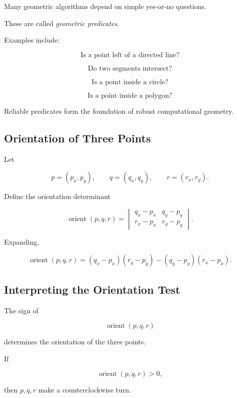 Many geometric algorithms depend on simple yes-or-no questions.

These are called \emph{geometric predicates}.

Examples include:

\[
\boxed{
\text{Is a point left of a directed line?}
}
\]

\[
\boxed{
\text{Do two segments intersect?}
}
\]

\[
\boxed{
\text{Is a point inside a circle?}
}
\]

\[
\boxed{
\text{Is a point inside a polygon?}
}
\]

Reliable predicates form the foundation of robust computational geometry.

\subsection{Orientation of Three Points}
\label{subsec:orientation-three-points}

Let

\[
p=(p_x,p_y),
\qquad
q=(q_x,q_y),
\qquad
r=(r_x,r_y).
\]

Define the orientation determinant

\[
\boxed{
\operatorname{orient}(p,q,r)
=
\begin{vmatrix}
q_x-p_x & q_y-p_y\\
r_x-p_x & r_y-p_y
\end{vmatrix}.
}
\]

Expanding,

\[
\boxed{
\operatorname{orient}(p,q,r)
=
(q_x-p_x)(r_y-p_y)
-
(q_y-p_y)(r_x-p_x).
}
\]

\subsection{Interpreting the Orientation Test}
\label{subsec:orientation-interpretation}

The sign of

\[
\operatorname{orient}(p,q,r)
\]

determines the orientation of the three points.

If

\[
\boxed{
\operatorname{orient}(p,q,r)>0,
}
\]

then \(p,q,r\) make a counterclockwise turn.

